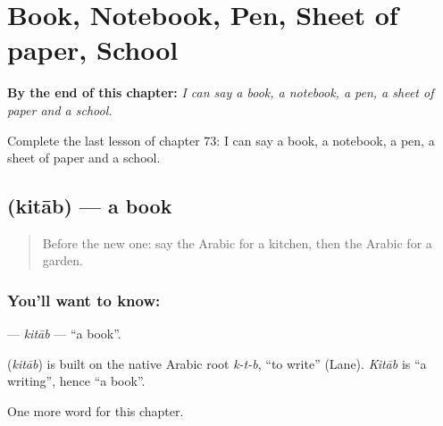 
\chapter{Book, Notebook, Pen, Sheet of paper, School}
\label{ch:ar-book-notebook-pen-sheet-of-paper-school}

\begin{chapteropening}
\textbf{By the end of this chapter:} \emph{I can say a book, a notebook, a pen, a sheet of paper and a school.}

Complete the last lesson of chapter 73: I can say a book, a notebook, a pen, a sheet of paper and a school.
\end{chapteropening}

\section[\texorpdfstring{\ar{كتاب} (kitāb)}{كتاب (kitāb)}]{ (kitāb) — a book}

\label{lesson:AR-C73-kitab}



\begin{quote}
Before the new one: say the Arabic for a kitchen, then the Arabic for a garden.
\end{quote}

\subsection*{You'll want to know: }
\textbf{} — \emph{kitāb} — \textquotedblleft{}a book\textquotedblright{}.

\begin{cousinweb}
\textbf{} (\emph{kitāb}) is built on the native Arabic root \emph{k-t-b}, \textquotedblleft{}to write\textquotedblright{} (Lane). \emph{Kitāb} is \textquotedblleft{}a writing\textquotedblright{}, hence \textquotedblleft{}a book\textquotedblright{}.
\end{cousinweb}

\begin{grammarlens}[title={What you've built}]
One more word for this chapter.
\end{grammarlens}

